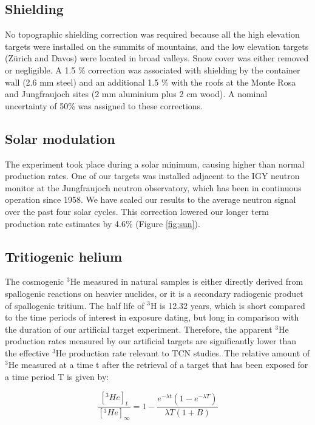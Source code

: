 \documentclass{article}
\begin{document}
\subsection{Shielding}

No topographic shielding correction  was required because all the high
elevation targets were installed on  the summits of mountains, and the
low  elevation targets (Z\"{u}rich  and Davos)  were located  in broad
valleys.   Snow cover  was either  removed  or negligible.   A 1.5  \%
correction was associated with shielding by the container wall (2.6 mm
steel) and an  additional 1.5 \% with the roofs at  the Monte Rosa and
Jungfraujoch  sites  (2 mm  aluminium  plus  2  cm wood).   A  nominal
uncertainty of 50\% was assigned to these corrections.

\subsection{Solar modulation}

The experiment took place during  a solar minimum, causing higher than
normal production rates.  One of our targets was installed adjacent to
the IGY neutron monitor at the Jungfraujoch neutron observatory, which
has  been in  continuous operation  since  1958.  We  have scaled  our
results to the average neutron signal over the past four solar cycles.
This correction  lowered our longer term production  rate estimates by
4.6\% (Figure \ref{fig:sun}).

\subsection{Tritiogenic helium}\label{sec:tritium}

The cosmogenic  $^3$He measured in natural samples  is either directly
derived from  spallogenic reactions  on heavier nuclides,  or it  is a
secondary radiogenic product of  spallogenic tritium. The half life of
$^3$H is 12.32  years, which is short compared to  the time periods of
interest in exposure dating, but  long in comparison with the duration
of our  artificial target  experiment. Therefore, the  apparent $^3$He
production rates measured by  our artificial targets are significantly
lower  than  the effective  $^3$He  production  rate  relevant to  TCN
studies. The relative amount of $^3$He  measured at a time t after the
retrieval of  a target that  has been exposed  for a time period  T is
given by:

$$
\frac{[^3He]_t}{[^3He]_{\infty}}  = 
1 - \frac{e^{-\lambda t}\left(1 - e^{-\lambda T}\right)}{\lambda T \left(1 +
    B\right)}
$$
\end{document}
